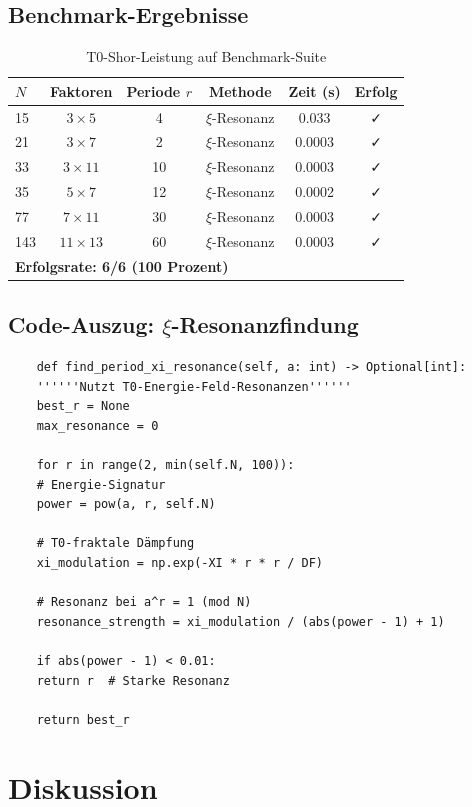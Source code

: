 \subsection{Benchmark-Ergebnisse}

\begin{table}[h]
	\centering
	\caption{T0-Shor-Leistung auf Benchmark-Suite}
	\label{tab:benchmark}
	\begin{tabular}{@{}lccccc@{}}
		\toprule
		$N$ & Faktoren & Periode $r$ & Methode & Zeit (s) & Erfolg \\
		\midrule
		15 & $3 \times 5$ & 4 & $\xi$-Resonanz & 0.033 & ✓ \\
		21 & $3 \times 7$ & 2 & $\xi$-Resonanz & 0.0003 & ✓ \\
		33 & $3 \times 11$ & 10 & $\xi$-Resonanz & 0.0003 & ✓ \\
		35 & $5 \times 7$ & 12 & $\xi$-Resonanz & 0.0002 & ✓ \\
		77 & $7 \times 11$ & 30 & $\xi$-Resonanz & 0.0003 & ✓ \\
		143 & $11 \times 13$ & 60 & $\xi$-Resonanz & 0.0003 & ✓ \\
		\midrule
		\multicolumn{5}{l}{\textbf{Erfolgsrate: 6/6 (100 Prozent)}} \\
		\bottomrule
	\end{tabular}
\end{table}

\subsection{Code-Auszug: $\xi$-Resonanzfindung}

\begin{lstlisting}
	def find_period_xi_resonance(self, a: int) -> Optional[int]:
	''''''Nutzt T0-Energie-Feld-Resonanzen''''''
	best_r = None
	max_resonance = 0
	
	for r in range(2, min(self.N, 100)):
	# Energie-Signatur
	power = pow(a, r, self.N)
	
	# T0-fraktale Dämpfung
	xi_modulation = np.exp(-XI * r * r / DF)
	
	# Resonanz bei a^r = 1 (mod N)
	resonance_strength = xi_modulation / (abs(power - 1) + 1)
	
	if abs(power - 1) < 0.01:
	return r  # Starke Resonanz
	
	return best_r
\end{lstlisting}

\section{Diskussion}

